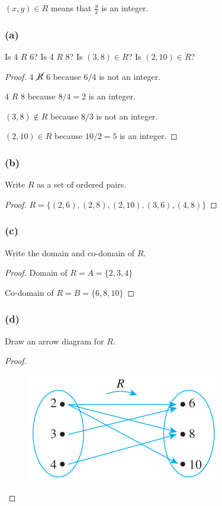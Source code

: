 \documentclass[14pt]{extarticle}
\newcommand{\dps}{\displaystyle}
\begin{document}
\begin{center}
$(x, y) \in R$ means that $\dps\frac{y}{x}$ is an integer.
\end{center}

\subsubsection{(a)}
Is 4 $R$ 6? Is 4 $R$ 8? Is $(3, 8) \in R$? Is $(2, 10) \in R$?

\begin{proof}
4 $\cancel{R}$ 6 because $6 / 4$ is not an integer.

4 $R$ 8 because $8 / 4 = 2$ is an integer.

$(3, 8) \notin R$ because $8 / 3$ is not an integer.

$(2, 10) \in R$ because $10 / 2 = 5$ is an integer.
\end{proof}

\subsubsection{(b)}
Write $R$ as a set of ordered pairs.

\begin{proof}
$R = \{(2, 6), (2, 8), (2, 10), (3, 6), (4, 8)\}$
\end{proof}

\subsubsection{(c)}
Write the domain and co-domain of $R$.

\begin{proof}
Domain of $R = A = \{2, 3, 4\}$

Co-domain of $R = B = \{6, 8, 10\}$
\end{proof}

\subsubsection{(d)}
Draw an arrow diagram for $R$.

\begin{proof}
\begin{figure}[ht!]
\centering
\includegraphics[scale=0.5]{../images/1.3.1.png}
\end{figure}
\end{proof}
\end{document}
